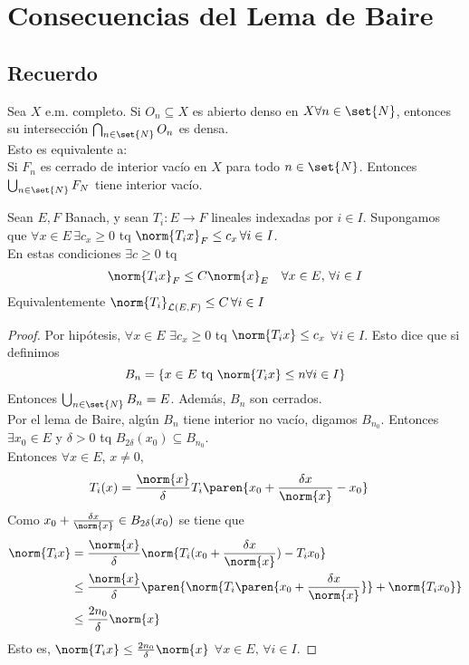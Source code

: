 \documentclass{notetaking}
\begin{document}
\section{Consecuencias del Lema de Baire}
\subsection{Recuerdo}
Sea \(X\) e.m. completo. Si \(O_n\subseteq X\) es abierto denso en \(X\forall n\in\set{N}\), entonces su intersección \(\bigcap_{n\in\set{N}}O_n\) es densa.\\
Esto es equivalente a:\\
Si \(F_n\) es cerrado de interior vacío en \(X\) para todo \(n\in\set{N}\). Entonces \(\bigcup_{n\in\set{N}}F_N\) tiene interior vacío.

\begin{thm}
    Sean \(E,F\) Banach, y sean \(T_i:E\rightarrow F\) lineales indexadas por \(i\in I\). Supongamos que \(\forall x\in E\,\exists c_x\geq 0\) tq \(\norm{T_ix}_F\leq c_x\,\forall i\in I\).\\
    En estas condiciones \(\exists c\geq 0\) tq
    \begin{align*}
        &\norm{T_ix}_F\leq C\norm{x}_E &\forall x\in E,\,\forall i\in I
    \end{align*}
    Equivalentemente \(\norm{T_i}_{\mathcal{L}(E,F)}\leq C\,\forall i\in I\)
\end{thm}
\begin{proof}
    Por hipótesis, \(\forall x\in E\) \(\exists c_x\geq 0\) tq \(\norm{T_ix}\leq c_x\) \(\forall i\in I\). Esto dice que si definimos
    \[
        B_n=\{x\in E\text{ tq }\norm{T_ix}\leq n\forall i\in I\}
    \]
    Entonces \(\bigcup_{n\in\set{N}}B_n=E\). Además, \(B_n\) son cerrados.\\
    Por el lema de Baire, algún \(B_n\) tiene interior no vacío, digamos \(B_{n_0}\). Entonces \(\exists x_0\in E\) y \(\delta>0\) tq \(B_{2\delta}(x_0)\subseteq B_{n_0}\).\\
    Entonces \(\forall x\in E\), \(x\neq0\),
    \begin{align*}
        T_i(x)&=\frac{\norm{x}}\delta T_i\paren{x_0+\frac{\delta x}{\norm{x}}-x_0}
    \end{align*}
    Como \(x_0+\frac{\delta x}{\norm{x}}\in B_{2\delta}(x_0)\) se tiene que
    \begin{align*}
        \norm{T_ix} &=\frac{\norm{x}}\delta\norm{T_i(x_0+\frac{\delta x}{\norm{x}})-T_ix_0}\\
        &\leq\frac{\norm{x}}\delta\paren{\norm{T_i\paren{x_0+\frac{\delta x}{\norm{x}}}}+\norm{T_ix_0}}\\
        &\leq\frac{2n_0}\delta\norm{x}
    \end{align*}
    Esto es, \(\norm{T_ix}\leq\frac{2n_0}\delta\norm{x}\) \(\forall x\in E,\,\forall i\in I\).
\end{proof}
\end{document}
